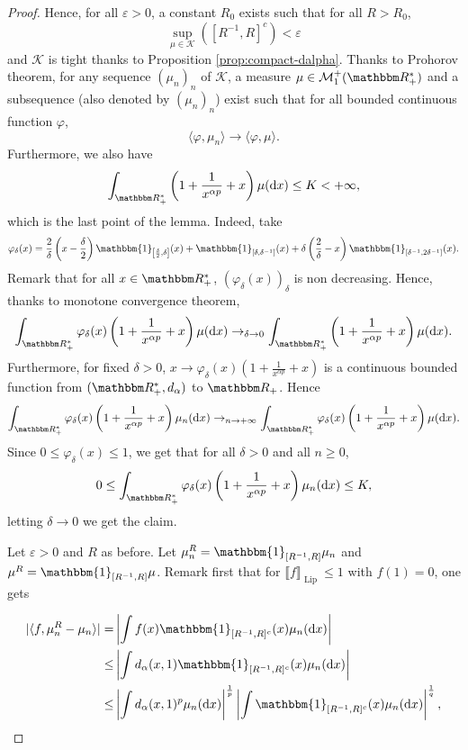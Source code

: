 \documentclass[a4paper,11pt, reqno]{amsart}
\newcommand{\cK}{\mathcal{K}}	\newcommand{\KK}{\mathbbm{K}}
\newcommand{\cM}{\mathcal{M}}	\newcommand{\MM}{\mathbbm{M}}
\newcommand{\eps}{\varepsilon}
\newcommand{\dd}{\mathop{}\!\mathrm{d}}
\newcommand{\1}{\mathbbm{1}}
\theoremstyle{plain}
\theoremstyle{definition}
\begin{document}
\begin{proof}
  Hence, for all $\eps > 0$, a constant $R_0$ exists such that for all
  $R > R_0$,
  \[ \underset{\mu \in \cK}{\sup} ([R^{- 1}, R]^c) < \eps \]
  and $\cK$ is tight thanks to Proposition \ref{prop:compact-dalpha}.
  Thanks to Prohorov theorem, for any sequence $(\mu_n)_n$ of $\cK$, a
  measure $\mu \in \cM_1^+ (\RR_+^{\ast})$ and a subsequence
  (also denoted by $(\mu_n)_n$) exist such that for all bounded continuous
  function $\varphi$,
  \[ \langle \varphi, \mu_n \rangle \rightarrow \langle \varphi, \mu \rangle .
  \]
  Furthermore, we also have
  \[ \int_{\RR_+^*} \left( 1 + \frac{1}{x^{\alpha p}} + x \right) \mu
     (\dd x) \le K < + \infty, 
    \]
     which is the last point of the lemma. 
  Indeed, take
  \begin{equation} \label{eq:definition-phidelta}
  \varphi_{\delta} (x) = \frac{2}{\delta} \left( x - \frac{\delta}{2}
     \right) \mathbbm{1}_{\left[ \frac{\delta}{2}, \delta \right]} (x) +
     \mathbbm{1}_{[\delta, \delta^{- 1}]} (x) + \delta \left( \frac{2}{\delta}
     - x \right) \mathbbm{1}_{[\delta^{- 1}, 2 \delta^{- 1}]} (x).
    \end{equation}
  Remark that for all $x \in \RR_+^{\ast}$, $(\varphi_{\delta}
  (x))_{\delta}$ is non decreasing. Hence, thanks to monotone convergence
  theorem,
  \[ \int_{\RR^{\ast}_+} \varphi_{\delta} (x) \left( 1 +
     \frac{1}{x^{\alpha p}} + x \right) \mu (\dd x) \to_{\delta
     \rightarrow 0} \int_{\RR^{\ast}_+} \left( 1 + \frac{1}{x^{\alpha
     p}} + x \right) \mu (\dd x) . \]
  Furthermore, for fixed $\delta > 0$, $x \rightarrow \varphi_{\delta} (x)
  \left( 1 + \frac{1}{x^{\alpha p}} + x \right)$ is a continuous bounded
  function from $(\RR_+^{\ast}, d_{\alpha})$ to $\RR_+$. Hence
  \[ \int_{\RR^{\ast}_+} \varphi_{\delta} (x) \left( 1 +
     \frac{1}{x^{\alpha p}} + x \right) \mu_n (\dd x) \to_{n
     \rightarrow + \infty} \int_{\RR^{\ast}_+} \varphi_{\delta} (x)
     \left( 1 + \frac{1}{x^{\alpha p}} + x \right) \mu (\dd x) . \]
  Since $0 \le \varphi_{\delta} (x) \le 1$, we get that for all
  $\delta > 0$ and all $n \ge 0$,
  \[ 0 \le \int_{\RR^{\ast}_+} \varphi_{\delta} (x) \left( 1 +
     \frac{1}{x^{\alpha p}} + x \right) \mu_n (\dd x) \le K, \]
  letting $\delta \rightarrow 0$ we get the claim.
  
  Let $\eps > 0$ and $R$ as before. Let $\mu^R_n = \1_{[R^{-
  1}, R]} \mu_n$ and $\mu^R = \1_{[R^{- 1}, R]} \mu$. Remark first
  that for $\llbracket f \rrbracket_{ \text{ Lip } } \le 1$ with $f (1) =
  0$, one gets
  
  \begin{align*}
    | \langle f, \mu_n^R - \mu_n \rangle | = & \left| \int f (x)
    \1_{[R^{- 1}, R]^c} (x) \mu_n (\dd x) \right|\\
    \le & \left| \int d_{\alpha} (x, 1) \1_{[R^{- 1}, R]^c} (x)
    \mu_n (\dd x) \right|\\
    \le & \left| \int d_{\alpha} (x, 1)^p \mu_n (\dd x)
    \right|^{\frac{1}{p}} \left| \int \1_{[R^{- 1}, R]^c} (x) \mu_n
    (\dd x) \right|^{\frac{1}{q}},
  \end{align*}
  

\end{proof}
\end{document}
